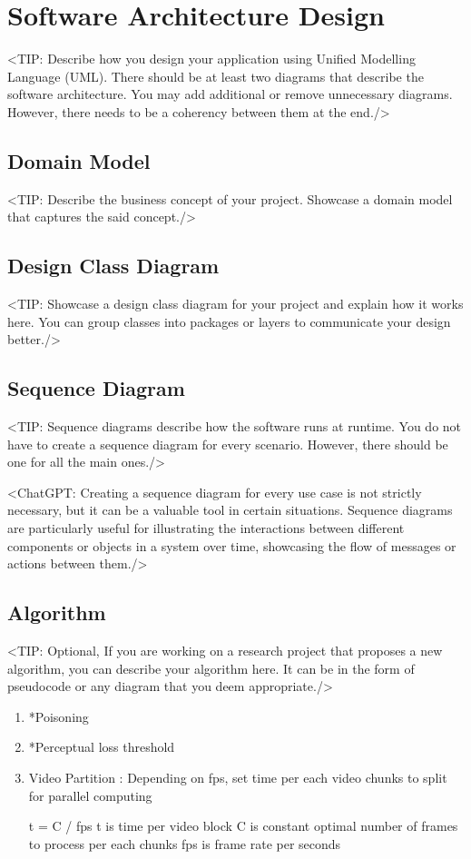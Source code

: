\chapter{Software Architecture Design}
\label{chap:software-architecture-design}
<TIP: Describe how you design your application using Unified Modelling
Language (UML). There should be at least two diagrams that describe the
software architecture. You may add additional or remove unnecessary diagrams.
However, there needs to be a coherency between them at the end./>

\section{Domain Model}
\label{section:domain-model}
<TIP: Describe the business concept of your project. Showcase a
domain model that captures the said concept./>

\section{Design Class Diagram}
\label{section:design-class-diagram}
<TIP: Showcase a design class diagram for your project and explain
how it works here. You can group classes into packages or layers to communicate your
design better./>

\section{Sequence Diagram}
\label{section:sequence-diagram}
<TIP: Sequence diagrams describe how the software runs at runtime.
You do not have to create a sequence diagram for every scenario. However,
there should be one for all the main ones./>

<ChatGPT: Creating a sequence diagram for every use case is not
strictly necessary, but it can be a valuable tool in certain situations. Sequence
diagrams are particularly useful for illustrating the interactions between different
components or objects in a system over time, showcasing the flow of messages
or actions between them./>

\section{Algorithm}
\label{section:algorithm}
<TIP: Optional, If you are working on a research project that proposes a new
algorithm, you can describe your algorithm here. It can be in the form of
pseudocode or any diagram that you deem appropriate./>
\begin{enumerate}
    \item *Poisoning
    \item *Perceptual loss threshold
    \item Video Partition : Depending on fps, set time per each video chunks to split for parallel computing

        t = C / fps
        t is time per video block
        C is constant optimal number of frames to process per each chunks
        fps is frame rate per seconds


\end{enumerate}

